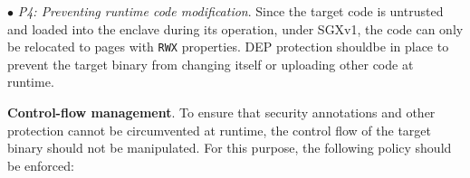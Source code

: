 
\vspace{2pt}\noindent$\bullet$\textit{ P4: Preventing runtime code modification}. Since the target code is untrusted and loaded into the enclave during its operation, under SGXv1, the code can only be relocated to \DIFdelbegin {}\DIFdelend pages with \texttt{RWX} properties. \DIFdelbegin {}\DIFdelend DEP protection should\DIFaddbegin {}\DIFaddend be in place to prevent the target binary from changing itself or uploading other code at runtime. 




\vspace{3pt}\noindent\textbf{Control-flow management}. 
To ensure that security annotations and other protection cannot be circumvented at runtime, the control flow of the target binary should not be manipulated. For this purpose, the following policy should be enforced:  

